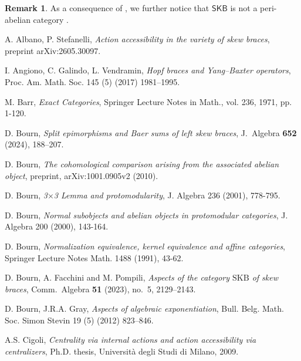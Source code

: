 \documentclass{amsart}
\theoremstyle{definition}
\newtheorem{remark}[theorem]{Remark}
\newcommand{\SKB}{\mathsf{SKB}}
\begin{document}
\begin{remark}
   As a consequence of \cite[Proposition 2.5]{GvdL}, we further notice that $\SKB$ is not a peri-abelian category \cite[Definition 4.1]{Bourn2010}.
\end{remark}



\begin{thebibliography}{}


A. Albano, P. Stefanelli,
\emph{Action accessibility in the variety of skew braces}, preprint arXiv:2605.30097. 

I. Angiono, C. Galindo, L. Vendramin, 
\emph{Hopf braces and Yang–Baxter operators}, Proc. Am. Math. Soc. 145 (5) (2017) 1981--1995.

M. Barr, 
\emph{Exact Categories}, Springer Lecture Notes in Math., vol. 236, 1971, pp. 1-120.

D. Bourn,
\emph{Split epimorphisms and Baer sums of left skew braces},
J.\ Algebra \textbf{652} (2024), 188--207.

D. Bourn,
\emph{The cohomological comparison arising from the associated abelian object},
preprint,  arXiv:1001.0905v2 (2010).


D. Bourn,
\emph{3$\times$3 Lemma and protomodularity}, J. Algebra 236 (2001), 778-795.

D. Bourn,
\emph{Normal subobjects and abelian objects in protomodular categories}, J. Algebra 200 (2000), 143-164.

D. Bourn,
\emph{Normalization equivalence, kernel equivalence and affine categories}, Springer Lecture Notes Math. 1488 (1991), 43-62.


D. Bourn, A. Facchini and M. Pompili,
\emph{Aspects of the category $\mathrm{SKB}$ of skew braces},
Comm.\ Algebra \textbf{51} (2023), no.~5, 2129--2143.

D. Bourn, J.R.A. Gray, 
\emph{Aspects of algebraic exponentiation}, Bull. Belg. Math. Soc. Simon Stevin 19 (5) (2012) 823–846.


A.S. Cigoli, 
\emph{Centrality via internal actions and action accessibility via centralizers}, Ph.D. thesis, Università degli Studi di Milano, 2009.


\end{thebibliography}
\end{document}
